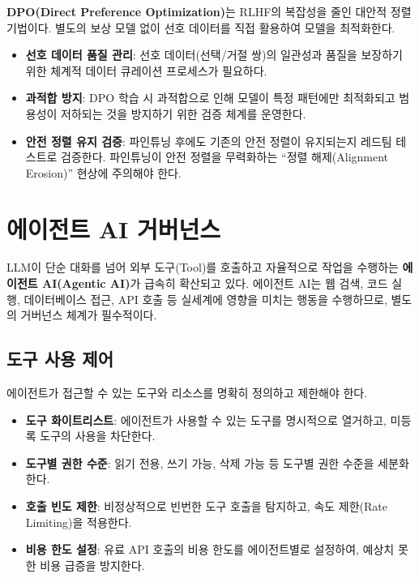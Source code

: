 \textbf{DPO(Direct Preference Optimization)}는 RLHF의 복잡성을 줄인 대안적 정렬 기법이다. 별도의 보상 모델 없이 선호 데이터를 직접 활용하여 모델을 최적화한다.

\begin{itemize}
 \item \textbf{선호 데이터 품질 관리}: 선호 데이터(선택/거절 쌍)의 일관성과 품질을 보장하기 위한 체계적 데이터 큐레이션 프로세스가 필요하다.
 \item \textbf{과적합 방지}: DPO 학습 시 과적합으로 인해 모델이 특정 패턴에만 최적화되고 범용성이 저하되는 것을 방지하기 위한 검증 체계를 운영한다.
 \item \textbf{안전 정렬 유지 검증}: 파인튜닝 후에도 기존의 안전 정렬이 유지되는지 레드팀\cite{brundage2020trustworthy} 테스트로 검증한다. 파인튜닝이 안전 정렬을 무력화하는 ``정렬 해제(Alignment Erosion)'' 현상에 주의해야 한다.
\end{itemize}

\section{에이전트 AI 거버넌스}
\label{sec:gen.2.6}

LLM이 단순 대화를 넘어 외부 도구(Tool)를 호출하고 자율적으로 작업을 수행하는 \textbf{에이전트 AI(Agentic AI)}가 급속히 확산되고 있다. 에이전트 AI는 웹 검색, 코드 실행, 데이터베이스 접근, API 호출 등 실세계에 영향을 미치는 행동을 수행하므로, 별도의 거버넌스 체계가 필수적이다.

\subsection{도구 사용 제어}

에이전트가 접근할 수 있는 도구와 리소스를 명확히 정의하고 제한해야 한다.

\begin{itemize}
 \item \textbf{도구 화이트리스트}: 에이전트가 사용할 수 있는 도구를 명시적으로 열거하고, 미등록 도구의 사용을 차단한다.
 \item \textbf{도구별 권한 수준}: 읽기 전용, 쓰기 가능, 삭제 가능 등 도구별 권한 수준을 세분화한다.
 \item \textbf{호출 빈도 제한}: 비정상적으로 빈번한 도구 호출을 탐지하고, 속도 제한(Rate Limiting)을 적용한다.
 \item \textbf{비용 한도 설정}: 유료 API 호출의 비용 한도를 에이전트별로 설정하여, 예상치 못한 비용 급증을 방지한다.
\end{itemize}

